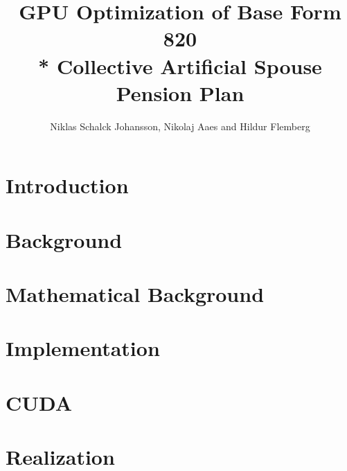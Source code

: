 \documentclass[oribibl]{llncs}
\title{GPU Optimization of Base Form 820 \\* Collective Artificial Spouse Pension Plan}
\author{Niklas Schalck Johansson, Nikolaj Aaes and Hildur Flemberg\\
\email{\{nsjo, niaa, hufl\}@itu.dk}}
\institute{IT University of Copenhagen}
\begin{document}
	\maketitle
	\tableofcontents
	\pagebreak
	
	
	\begin{abstract}
		
		\label{abstract}
	\end{abstract}
	
	\section{Introduction}
	
	
	\label{introduction}
		
	\section{Background}
		
	
	\label{background}
		
	\section{Mathematical Background}
		
	
	\label{themath}
		
	\section{Implementation}

	
	\label{implementation}
		
	\section{CUDA}

	
	\label{cuda}
	
	\section{Realization}
	
	
	\label{realization}
		
\end{document}
